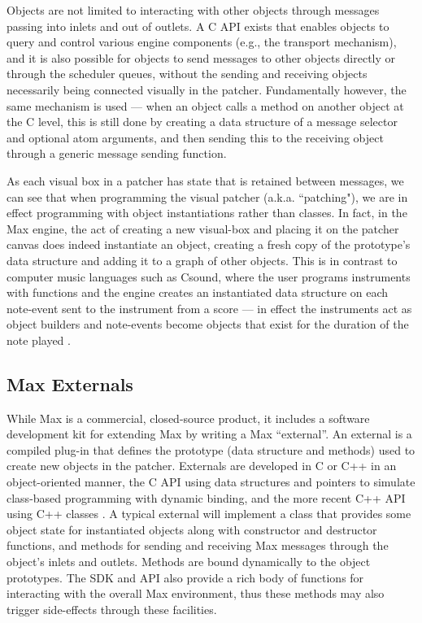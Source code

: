 \documentclass[acmsmall, anonymous, review]{acmart}
\begin{document}
Objects are not limited to interacting with other objects through messages passing into inlets and out of 
outlets. A C API exists that enables objects to query and control various engine components (e.g., 
the transport mechanism), and it is also possible for objects to send messages to other objects 
directly or through the scheduler queues, without the sending and receiving objects 
necessarily being connected visually in the patcher. Fundamentally however, the same mechanism
is used --- when an object calls a method on another object at the C level, this is still done
by creating a data structure of a message selector and optional atom arguments, 
and then sending this to the receiving object through a generic message sending function.

As each visual box in a patcher has state that is retained between messages, we can see that when
programming the visual patcher (a.k.a. ``patching"), we are in effect programming with
object instantiations rather than classes. In fact, in the Max engine, the act of creating
a new visual-box and placing it on the patcher canvas does indeed instantiate an object, creating
a fresh copy of the prototype's data structure and adding it to a graph of other objects.
This is in contrast to computer music languages such as Csound, where the user programs instruments 
with functions and the engine creates an instantiated data structure on each note-event sent to 
the instrument from a score --- in effect the instruments act as object builders and note-events 
become objects that exist for the duration of the note played \cite{Lazzarini2013}.

\subsection{Max Externals}

While Max is a commercial, closed-source product, it includes a software development kit for 
extending Max by writing a Max “external”. An external is a compiled plug-in that defines the  
prototype (data structure and methods) used to create new objects in the patcher.  
Externals are developed in C or C++ in an object-oriented manner, the C API using data 
structures and pointers to simulate class-based programming with dynamic binding,
and the more recent C++ API using C++ classes \cite{Zicarelli2002}.
A typical external will implement a class that provides some object state for instantiated
objects along with constructor and destructor functions, and  
methods for sending and receiving Max messages through the object’s inlets and outlets.
Methods are bound dynamically to the object prototypes.
The SDK and API also provide a rich body of functions for interacting with the overall Max
environment, thus these methods may also trigger side-effects through these facilities.
\end{document}
